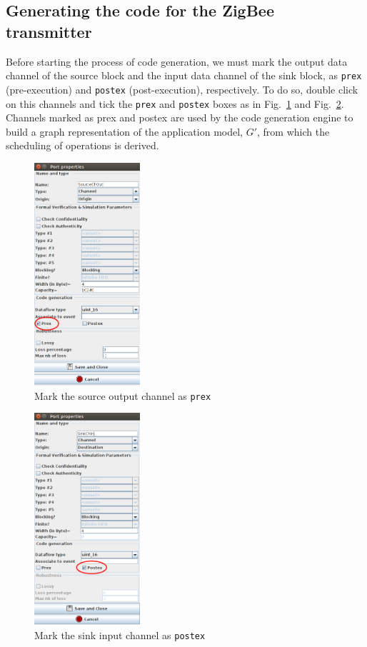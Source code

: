 \documentclass{llncs}
\begin{document}
\subsection{Generating the code for the ZigBee transmitter}
%
Before starting the process of code generation, we must mark the output data channel of the source block and the input
data channel of the sink block, as \texttt{prex} (pre-execution) and \texttt{postex} (post-execution), respectively. To
do so, double click on this channels and tick the \texttt{prex} and \texttt{postex} boxes as in Fig.~\ref{fig:Prex} and
Fig.~\ref{fig:Postex}. Channels marked as prex and postex are used by the code generation engine to build a graph
representation of the application model, $G'$, from which the scheduling of operations is derived.
%
\begin{figure}[htbp]
	\centering
 	\includegraphics[width=0.35\textwidth]{figures/screenshot/Prex.png}
	\caption{Mark the source output channel as \texttt{prex}}
	\label{fig:Prex}
\end{figure}
%
%
\begin{figure}[htbp]
	\centering
 	\includegraphics[width=0.35\textwidth]{figures/screenshot/Postex.png}
	\caption{Mark the sink input channel as \texttt{postex}}
	\label{fig:Postex}
\end{figure}
\end{document}
